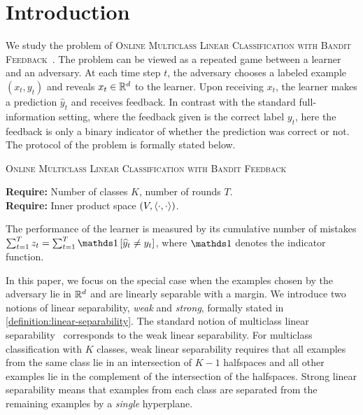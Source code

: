 \section{Introduction}
\label{section:introduction}

We study the problem of \textsc{Online Multiclass Linear Classification with
Bandit Feedback}~\citep{Kakade-Shalev-Shwartz-Tewari-2008}. The problem can be
viewed as a repeated game between a learner and an adversary. At each time step
$t$, the adversary chooses a labeled example $(x_t, y_t)$ and reveals $x_t\in
\mathbb{R}^d$ to the learner. Upon receiving $x_t$, the learner makes a prediction
$\widehat{y}_t$ and receives feedback. In contrast with the standard
full-information setting, where the feedback given is the correct label $y_t$,
here the feedback is only a binary indicator of whether the prediction was
correct or not. The protocol of the problem is formally stated below.

\begin{protocol}[h]
\caption{\textsc{Online Multiclass Linear Classification with Bandit Feedback}
\label{algorithm:game-protocol}}
\textbf{Require:} Number of classes $K$, number of rounds $T$. \\
\textbf{Require:} Inner product space $(V,\left\langle \cdot, \cdot \right\rangle)$. \\
\end{protocol}

The performance of the learner is measured by its cumulative number of
mistakes $\sum_{t=1}^T z_t = \sum_{t=1}^T \indicator{\widehat y_t \neq y_t}$,
where $\one$ denotes the indicator function.

In this paper, we focus on the special case when the examples chosen by the
adversary lie in $\mathbb{R}^d$ and are linearly separable with a margin. We introduce
two notions of linear separability, \emph{weak} and \emph{strong}, formally
stated in \autoref{definition:linear-separability}. The standard notion of
multiclass linear separability~\citep{Crammer-Singer-2003} corresponds to the
weak linear separability. For multiclass classification with $K$ classes, weak
linear separability requires that all examples from the same class lie in an
intersection of $K-1$ halfspaces and all other examples lie in the complement of
the intersection of the halfspaces. Strong linear separability means that
examples from each class are separated from the remaining examples by a
\emph{single} hyperplane.

